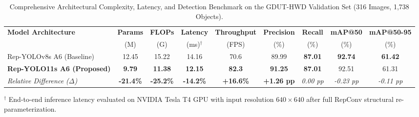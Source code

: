 

\begin{table}[t]
\centering
\caption{Comprehensive Architectural Complexity, Latency, and Detection Benchmark on the GDUT-HWD Validation Set (316 Images, 1,738 Objects).}
\label{tab:gdut_overall_benchmark}
\small
\begin{tabular*}{\textwidth}{@{\extracolsep{\fill}}lcccccccc@{}}
\toprule
\textbf{Model Architecture} & \textbf{Params} & \textbf{FLOPs} & \textbf{Latency} & \textbf{Throughput} & \textbf{Precision} & \textbf{Recall} & \textbf{mAP@50} & \textbf{mAP@50-95} \\
 & (M) & (G) & (ms)$^{\dagger}$ & (FPS) & (\%) & (\%) & (\%) & (\%) \\
\midrule
Rep-YOLOv8s A6 (Baseline) & 12.45 & 15.22 & 14.16 & 70.6 & 89.99 & \textbf{87.01} & \textbf{92.74} & \textbf{61.42} \\
\textbf{Rep-YOLO11s A6 (Proposed)} & \textbf{9.79} & \textbf{11.38} & \textbf{12.15} & \textbf{82.3} & \textbf{91.25} & \textbf{87.01} & 92.51 & 61.31 \\
\midrule
\textit{Relative Difference ($\Delta$)} & \textbf{-21.4\%} & \textbf{-25.2\%} & \textbf{-14.2\%} & \textbf{+16.6\%} & \textbf{+1.26 pp} & \textit{0.00 pp} & \textit{-0.23 pp} & \textit{-0.11 pp} \\
\bottomrule
\end{tabular*}
\begin{flushleft}
\footnotesize $^{\dagger}$ End-to-end inference latency evaluated on NVIDIA Tesla T4 GPU with input resolution $640 \times 640$ after full RepConv structural re-parameterization.
\end{flushleft}
\end{table}

